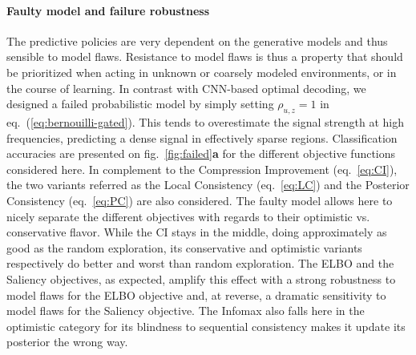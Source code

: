 \documentclass{article}
\begin{document}
\paragraph{Faulty model and failure robustness}
The predictive policies are very dependent on the generative models and thus sensible to model flaws. Resistance to model flaws is thus a property that should be prioritized when acting in unknown or coarsely modeled environments, or in the course of learning. In contrast with CNN-based optimal decoding, we designed a failed probabilistic model by simply setting $\rho_{u,z} = 1$ in eq.~(\ref{eq:bernouilli-gated}).  This tends to overestimate the signal strength at high frequencies, predicting a dense signal in effectively sparse regions. Classification accuracies are presented on fig.~\ref{fig:failed}\textbf{a} for the different objective functions considered here. In complement to the Compression Improvement (eq.~\ref{eq:CI}), the two variants referred as the Local Consistency (eq.~\ref{eq:LC}) and the Posterior Consistency (eq.~\ref{eq:PC}) are also considered. The faulty model allows here to nicely separate the different objectives with regards to their optimistic vs. conservative flavor. While the CI stays in the middle, doing approximately as good as the random exploration, its conservative and optimistic variants respectively do better and worst than random exploration. The ELBO and the Saliency objectives, as expected, amplify this effect with a strong robustness to model flaws for the ELBO objective and, at reverse, a dramatic sensitivity  to model flaws for the 	Saliency objective. The Infomax also falls here in the optimistic category for its blindness to sequential consistency makes it update its posterior the wrong way.
\end{document}
